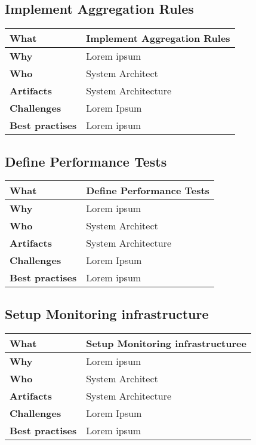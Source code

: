 \subsection{Implement Aggregation Rules}
 \label{table:ch6_Task_Implement_Aggregation_Rules}
\begin{tabular}
	{|m{3cm}|m{10cm}|} \hline \bfseries What & Implement Aggregation Rules\\
	\hline \bfseries Why & Lorem ipsum\\
	\hline \bfseries Who & System Architect\\
	\hline \bfseries Artifacts & System Architecture\\
	\hline \bfseries Challenges & Lorem Ipsum\\
	\hline \bfseries Best practises & Lorem ipsum\\
	\hline 
\end{tabular}

\subsection{Define Performance Tests}
 \label{table:ch6_Task_Define_Performance_Tests}
\begin{tabular}
	{|m{3cm}|m{10cm}|} \hline \bfseries What & Define Performance Tests\\
	\hline \bfseries Why & Lorem ipsum\\
	\hline \bfseries Who & System Architect\\
	\hline \bfseries Artifacts & System Architecture\\
	\hline \bfseries Challenges & Lorem Ipsum\\
	\hline \bfseries Best practises & Lorem ipsum\\
	\hline 
\end{tabular}

\subsection{Setup Monitoring infrastructure}
 \label{table:ch6_Task_Setup_Monitoring_infrastructure}
\begin{tabular}
	{|m{3cm}|m{10cm}|} \hline \bfseries What & Setup Monitoring infrastructuree\\
	\hline \bfseries Why & Lorem ipsum\\
	\hline \bfseries Who & System Architect\\
	\hline \bfseries Artifacts & System Architecture\\
	\hline \bfseries Challenges & Lorem Ipsum\\
	\hline \bfseries Best practises & Lorem ipsum\\
	\hline 
\end{tabular}


